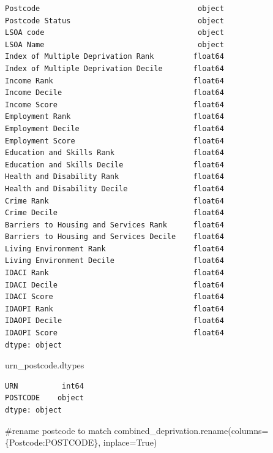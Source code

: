 \documentclass[
  letterpaper,
  DIV=11,
  numbers=noendperiod]{scrartcl}
\newenvironment{Shaded}{\begin{snugshade}}{\end{snugshade}}
\newcommand{\CommentTok}[1]{\textcolor[rgb]{0.37,0.37,0.37}{#1}}
\newcommand{\NormalTok}[1]{\textcolor[rgb]{0.00,0.23,0.31}{#1}}
\newcommand{\OperatorTok}[1]{\textcolor[rgb]{0.37,0.37,0.37}{#1}}
\newcommand{\StringTok}[1]{\textcolor[rgb]{0.13,0.47,0.30}{#1}}
\newcommand{\VariableTok}[1]{\textcolor[rgb]{0.07,0.07,0.07}{#1}}
\begin{document}
\begin{verbatim}
Postcode                                    object
Postcode Status                             object
LSOA code                                   object
LSOA Name                                   object
Index of Multiple Deprivation Rank         float64
Index of Multiple Deprivation Decile       float64
Income Rank                                float64
Income Decile                              float64
Income Score                               float64
Employment Rank                            float64
Employment Decile                          float64
Employment Score                           float64
Education and Skills Rank                  float64
Education and Skills Decile                float64
Health and Disability Rank                 float64
Health and Disability Decile               float64
Crime Rank                                 float64
Crime Decile                               float64
Barriers to Housing and Services Rank      float64
Barriers to Housing and Services Decile    float64
Living Environment Rank                    float64
Living Environment Decile                  float64
IDACI Rank                                 float64
IDACI Decile                               float64
IDACI Score                                float64
IDAOPI Rank                                float64
IDAOPI Decile                              float64
IDAOPI Score                               float64
dtype: object
\end{verbatim}

\begin{Shaded}
\begin{Highlighting}[]
\NormalTok{urn\_postcode.dtypes}
\end{Highlighting}
\end{Shaded}

\begin{verbatim}
URN          int64
POSTCODE    object
dtype: object
\end{verbatim}

\begin{Shaded}
\begin{Highlighting}[]
\CommentTok{\#rename postcode to match}
\NormalTok{combined\_deprivation.rename(columns}\OperatorTok{=}\NormalTok{\{}\StringTok{\textquotesingle{}Postcode\textquotesingle{}}\NormalTok{:}\StringTok{\textquotesingle{}POSTCODE\textquotesingle{}}\NormalTok{\}, inplace}\OperatorTok{=}\VariableTok{True}\NormalTok{)}
\end{Highlighting}
\end{Shaded}
\end{document}
